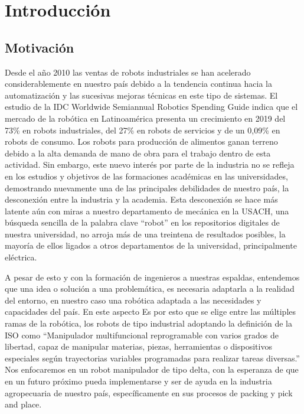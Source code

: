 \chapter{Introducción}\label{CAP1}

\section{Motivación}

Desde el año 2010 las ventas de robots industriales se han acelerado considerablemente en nuestro país debido a la tendencia continua hacia la automatización y las sucesivas mejoras técnicas en este tipo de sistemas. El estudio de la IDC Worldwide Semiannual Robotics Spending Guide indica que el mercado de la robótica en Latinoamérica presenta un crecimiento en 2019 del 73\% en robots industriales, del 27\% en robots de servicios y de un 0,09\% en robots de consumo. Los robots para producción de alimentos ganan terreno debido a la alta demanda de mano de obra para el trabajo dentro de esta actividad. Sin embargo, este nuevo interés por parte de la industria no se refleja en los estudios y objetivos de las formaciones académicas en las universidades, demostrando nuevamente una de las principales debilidades de nuestro país, la desconexión entre la industria y la academia. Esta desconexión se hace más latente aún con miras a nuestro departamento de mecánica en la USACH, una búsqueda sencilla de la palabra clave “robot” en los repositorios digitales de nuestra universidad, no arroja más de una treintena de resultados posibles, la mayoría de ellos ligados a otros departamentos de la universidad, principalmente eléctrica.

A pesar de esto y con la formación de ingenieros a nuestras espaldas, entendemos que una idea o solución a una problemática, es necesaria adaptarla a la realidad del entorno, en nuestro caso una robótica adaptada a las necesidades y capacidades del país. En este aspecto
Es por esto que se elige entre las múltiples ramas de la robótica, los robots de tipo industrial adoptando la definición de la ISO como “Manipulador multifuncional reprogramable con varios grados de libertad, capaz de manipular materias, piezas, herramientas o dispositivos especiales según trayectorias variables programadas para realizar tareas diversas.” Nos enfocaremos en un robot manipulador de tipo delta, con la esperanza de que en un futuro próximo pueda implementarse y ser de ayuda en la industria agropecuaria de nuestro país, específicamente en sus procesos de packing y pick and place.

